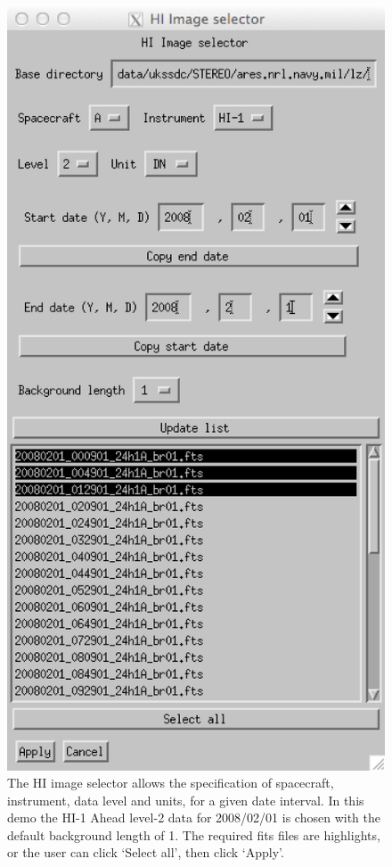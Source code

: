 \documentclass[12pt, a4paper, oneside]{article}
\begin{document}
\begin{figure}[]
\centering
\includegraphics[scale=0.75]{hi_image_selector.png}
\caption{The HI image selector allows the specification of spacecraft, instrument, data level and units, for a given date interval. In this demo the HI-1 Ahead level-2 data for 2008/02/01 is chosen with the default background length of 1. The required fits files are highlights, or the user can click `Select all', then click `Apply'.}
\label{hi_image_selector}
\end{figure}
\end{document}
